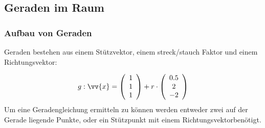 \documentclass[a4paper, 15pt]{article}
\begin{document}
\subsection{Geraden im Raum}
\subsubsection{Aufbau von Geraden}
Geraden bestehen aus einem Stützvektor, einem streck/stauch Faktor und einem Richtungsvektor:\newline\newline
\begin{minipage}{.49\textwidth}
\begin{equation*}
g:\vv{x} = \left(\begin{array}{c} 1 \\ 1 \\ 1 \end{array}\right) + r \cdot \left(\begin{array}{c} 0.5 \\ 2 \\ -2 \end{array}\right)
\vspace{1cm}
\end{equation*}
Um eine Geradengleichung ermitteln zu können werden entweder zwei auf der Gerade liegende Punkte, oder ein Stützpunkt mit einem Richtungsvektor\newline benötigt.
\end{minipage}
\begin{minipage}{.49\textwidth}
\flushright
\begin{center}
\end{center}
\end{minipage}
\end{document}
